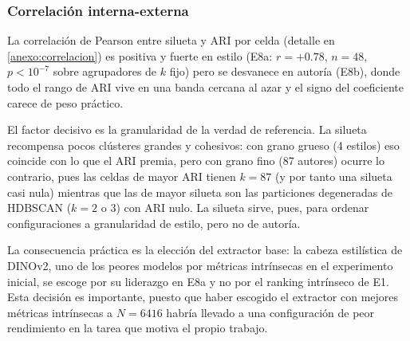 \subsubsection{Correlación interna-externa}
\label{subsubsec:res-correlacion}
La correlación de Pearson entre silueta y ARI por celda (detalle en
\ref{anexo:correlacion}) es positiva y fuerte en estilo (E8a: $r=+0.78$,
$n=48$, $p<10^{-7}$ sobre agrupadores de $k$ fijo) pero se desvanece en autoría
(E8b), donde todo el rango de ARI vive en una banda cercana al azar y el signo
del coeficiente carece de peso práctico.

El factor decisivo es la granularidad de la verdad de referencia. La silueta
recompensa pocos clústeres grandes y cohesivos: con grano grueso (4 estilos)
eso coincide con lo que el ARI premia, pero con grano fino (87 autores) ocurre
lo contrario, pues las celdas de mayor ARI tienen $k=87$ (y por tanto una
silueta casi nula) mientras que las de mayor silueta son las particiones
degeneradas de HDBSCAN ($k=2$ o $3$) con ARI nulo. La silueta sirve, pues, para
ordenar configuraciones a granularidad de estilo, pero no de autoría.

La consecuencia práctica es la elección del extractor base: la cabeza
estilística de DINOv2, uno de los peores modelos por métricas intrínsecas en el
experimento inicial, se escoge por su liderazgo en E8a y no por el ranking
intrínseco de E1. Esta decisión es importante, puesto que haber escogido el
extractor con mejores métricas intrínsecas a $N=6416$ habría llevado a una
configuración de peor rendimiento en la tarea que motiva el propio trabajo.

